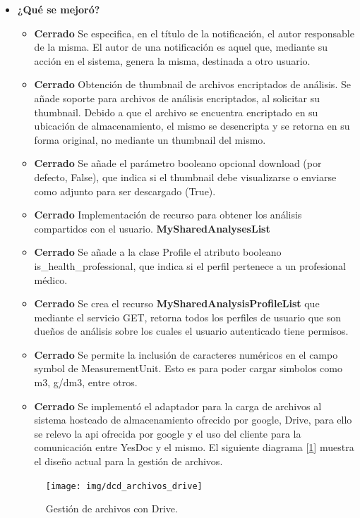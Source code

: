 \begin{itemize}
   		\item \textbf{¿Qué se mejoró?}
        	\begin{itemize}
                \item \textbf{Cerrado} Se especifica, en el título de la notificación, el autor responsable de la misma.  El autor de una notificación es aquel que, mediante su acción en el sistema, genera la misma, destinada a otro usuario.
                \item \textbf{Cerrado} Obtención de thumbnail de archivos encriptados de análisis. Se añade soporte para archivos de análisis encriptados, al solicitar su thumbnail. Debido a que el archivo se encuentra encriptado en su ubicación de almacenamiento, el mismo se desencripta y se retorna en su forma original, no mediante un thumbnail del mismo.
                \item \textbf{Cerrado} Se añade el parámetro booleano opcional download (por defecto, False), que indica si el thumbnail debe visualizarse o enviarse como adjunto para ser descargado (True).
                \item \textbf{Cerrado} Implementación de recurso para obtener los análisis compartidos con el usuario. \textbf{MySharedAnalysesList}
                \item \textbf{Cerrado} Se añade a la clase Profile el atributo booleano is\_health\_professional, que indica si el perfil pertenece a un profesional médico.
                \item \textbf{Cerrado} Se crea el recurso \textbf{MySharedAnalysisProfileList} que mediante el servicio GET, retorna todos los perfiles de usuario que son dueños de análisis sobre los cuales el usuario autenticado tiene permisos. 
                \item \textbf{Cerrado} Se permite la inclusión de caracteres numéricos en el campo symbol de MeasurementUnit. Esto es para poder cargar simbolos como m3, g/dm3, entre otros.
                \item \textbf{Cerrado} Se implementó el adaptador para la carga de archivos al sistema hosteado de almacenamiento ofrecido por google, Drive, para ello se relevo la api ofrecida por google y el uso del cliente para la comunicación entre YesDoc y el mismo. El siguiente diagrama [\ref{9-archivos-drive}] muestra el diseño actual para la gestión de archivos.   
			\end{itemize}
			
				\begin{figure}[h]
			        \centering
			        \texttt{[image: img/dcd\_archivos\_drive]}
			        \caption{Gestión de archivos con Drive.}
					\label{9-archivos-drive}
			    \end{figure}


\end{itemize}
